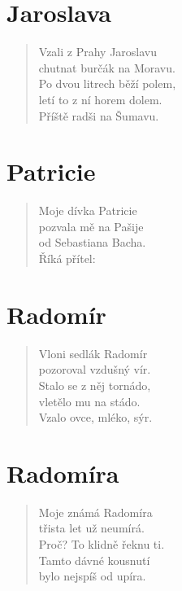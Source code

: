 \section*{Jaroslava}
\begin{verse}
Vzali z Prahy Jaroslavu\\
chutnat burčák na Moravu.\\
Po dvou litrech běží polem,\\
letí to z ní horem dolem.\\
Příště radši na Šumavu.
\end{verse}

\section*{Patricie}
\begin{verse}
Moje dívka Patricie\\
pozvala mě na Pašije\\
od Sebastiana Bacha.\\
Říká přítel: 
\end{verse}

\section*{Radomír}
\begin{verse}
Vloni sedlák Radomír\\
pozoroval vzdušný vír.\\
Stalo se z něj tornádo,\\
vletělo mu na stádo.\\
Vzalo ovce, mléko, sýr.
\end{verse}

\section*{Radomíra}
\begin{verse}
Moje známá Radomíra\\
třista let už neumírá.\\
Proč? To klidně řeknu ti.\\
Tamto dávné kousnutí\\
bylo nejspíš od upíra.
\end{verse}

